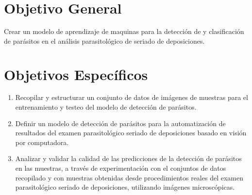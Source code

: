 \documentclass[letter,12pt]{report}
\begin{document}
\section{Objetivo General}
Crear un modelo de aprendizaje de maquinas para la detección de y clasificación de
parásitos en el análisis parasitológico de seriado de deposiciones.

\section{Objetivos Específicos}
\begin{enumerate}\justifying
    \item Recopilar y estructurar un conjunto de datos de imágenes de muestras para el entrenamiento y testeo del modelo de detección de parásitos.
    \item Definir un modelo de detección de parásitos para la automatización de resultados del examen parasitológico seriado de deposiciones basado en visión por computadora.
    \item Analizar y validar la calidad de las predicciones de la detección de parásitos en
        las muestras, a través de experimentación con el conjuntos de datos recopilado y
        con muestras obtenidas desde procedimientos reales del examen parasitológico
        seriado de deposiciones, utilizando imágenes microscópicas.
\end{enumerate}

%
\end{document}
